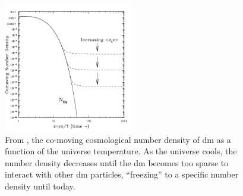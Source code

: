 \begin{figure}
      \centering
      \includegraphics[width=0.5\textwidth]{figures/theory/number-density-at-freeze-out.png}
      \caption{
            From \cite{thermal-freezeout-diagram-1996}, the co-moving cosmological number density of \gls{dm} as a function of the universe
            temperature. As the universe cools, the number density decreases until the \gls{dm}
            becomes too sparse to interact with other \gls{dm} particles, ``freezing'' to a specific
            number density until today.
      }
      \label{fig:number-density}
\end{figure}

